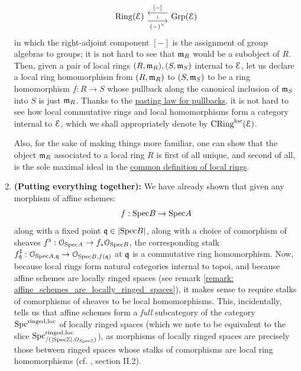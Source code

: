 \begin{remark}
\begin{enumerate}
                                $$
                                    \begin{tikzcd}
                                    	{\Ring(\E)} & {\Grp(\E)}
                                    	\arrow[""{name=0, anchor=center, inner sep=0}, "{(-)^{\x}}"', shift right=2, from=1-1, to=1-2]
                                    	\arrow[""{name=1, anchor=center, inner sep=0}, "{[-]}"', shift right=2, from=1-2, to=1-1]
                                    	\arrow["\dashv"{anchor=center, rotate=-90}, draw=none, from=1, to=0]
                                    \end{tikzcd}
                                $$
                            in which the right-adjoint component $[-]$ is the assignment of group algebras to groups; it is not hard to see that $\mathfrak{m}_R$ would be a subobject of $R$. Then, given a pair of local rings $(R, \mathfrak{m}_R), (S, \mathfrak{m}_S)$ internal to $\mathcal{E}$, let us declare a local ring homomorphism from $(R, \mathfrak{m}_R)$ to $(S, \mathfrak{m}_S)$ to be a ring homomorphism $f: R \to S$ whose pullback along the canonical inclusion of $\mathfrak{m}_S$ into $S$ is just $\mathfrak{m}_R$. Thanks to the \href{https://ncatlab.org/nlab/show/pasting+law+for+pullbacks}{\underline{pasting law for pullbacks}}, it is not hard to see how local commutative rings and local homomorphisms form a category internal to $\mathcal{E}$, which we shall appropriately denote by $\mathrm{CRing}^{\mathrm{loc}}(\mathcal{E})$. 
                            
                            Also, for the sake of making things more familiar, one can show that the object $\mathfrak{m}_R$ associated to a local ring $R$ is first of all unique, and second of all, is the sole maximal ideal in the \href{https://stacks.math.columbia.edu/tag/07BH}{\underline{common definition of local rings}}.
                            \item \textbf{(Putting everything together):} We have already shown that given any morphism of affine schemes:
                                $$f: \mathrm{Spec} B \to \mathrm{Spec} A$$
                            along with a fixed point $\mathfrak{q} \in |\mathrm{Spec} B|$, along with a choice of comorphism of sheaves $f^{\flat}: \mathcal{O}_{\mathrm{Spec} A} \to f_*\mathcal{O}_{\mathrm{Spec} B}$, the corresponding stalk $f^{\sharp}_{\mathfrak{q}}: \mathcal{O}_{\mathrm{Spec} A, \mathfrak{q}} \to \mathcal{O}_{\mathrm{Spec} B, f(\mathfrak{q})}$ at $\mathfrak{q}$ is a commutative ring homomorphism. Now, because local rings form natural categories internal to topoi, and because affine schemes are locally ringed spaces (see remark \ref{remark: affine_schemes_are_locally_ringed_spaces}), it makes sense to require stalks of comorphisms of sheaves to be local homomorphisms. This, incidentally, tells us that affine schemes form a \textit{full} subcategory of the category $\mathrm{Spc}^{\mathrm{ringed}, \mathrm{loc}}$ of locally ringed spaces (which we note to be equivalent to the slice $\mathrm{Spc}^{\mathrm{ringed}, \mathrm{loc}}_{/(|\mathrm{Spec} \mathbb{Z}|, \mathcal{O}_{\mathrm{Spec} \mathbb{Z}})}$), as morphisms of locally ringed spaces are precisely those between ringed spaces whose stalks of comorphisms are local ring homomorphisms (cf. \cite{hartshorne}, section II.2). 
                        \end{enumerate}
                \end{remark}
                
